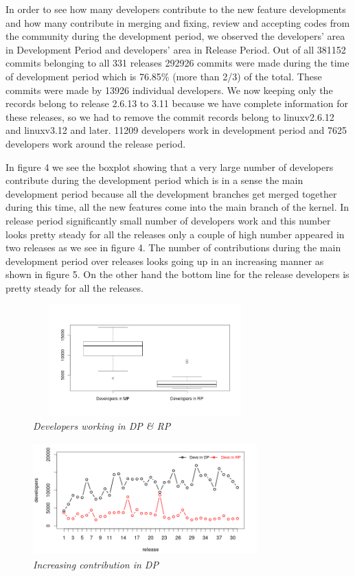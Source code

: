 \documentclass{acm_proc_article-sp}
\begin{document}
In order to see how many developers contribute to the new feature developments and how many contribute in merging and fixing, review and accepting codes from the community during the development period, we observed the developers' area in Development Period and developers' area in Release Period. Out of all 381152 commits belonging to all 331 releases 292926 commits were made during the time of development period which is 76.85\% (more than 2/3) of the total. These commits were made by 13926 individual developers. We now keeping only the records belong to release 2.6.13 to 3.11 because we have complete information for these releases, so we had to remove the commit records belong to linuxv2.6.12 and linuxv3.12 and later. 11209 developers work in development period and 7625 developers work around the release period.

In figure 4 we see the boxplot showing that a very large number of developers contribute during the development period which is in a sense the main development period because all the development branches get merged together during this time, all the new features come into the main branch of the kernel. In release period significantly small number of developers work and this number looks pretty steady for all the releases only a couple of high number appeared in two releases as we see in figure 4. The number of contributions during the main development period over releases looks going up in an increasing manner as shown in figure 5. On the other hand the bottom line for the release developers is pretty steady for all the releases.

\begin{figure}
\begin{center}
\includegraphics[height=1.7in,width=3.4in]{devsMPRPbox.png}
\caption{\small \sl Developers working in DP \& RP}
\end{center}
\end{figure}

\begin{figure}
\begin{center}
\includegraphics[height=1.7in,width=3.4in]{devsMPRP.png}
\caption{\small \sl Increasing contribution in DP}
\end{center}
\end{figure}
\end{document}
